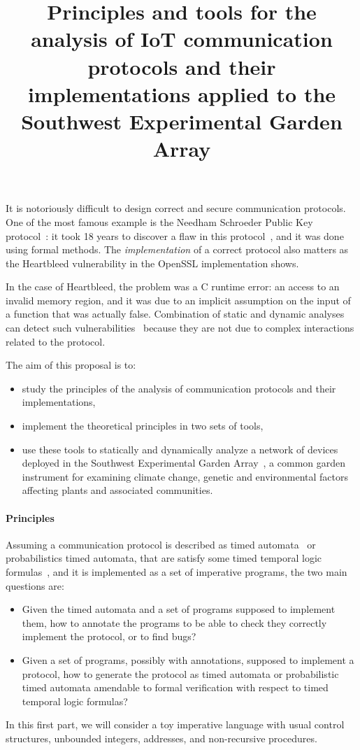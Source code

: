 \documentclass[11pt]{article}
\title{Principles and tools for the analysis of IoT communication
  protocols and their implementations applied to the\\Southwest
  Experimental Garden Array}
\begin{document}
\maketitle

It is notoriously difficult to design correct and secure communication
protocols. One of the most famous example is the Needham Schroeder
Public Key protocol~\cite{NS1978:CACM}: it took 18 years to discover a
flaw in this protocol~\cite{LOW1996:TACAS}, and it was done using
formal methods. The {\em implementation} of a correct protocol also
matters as the Heartbleed vulnerability in the OpenSSL implementation
shows.

In the case of Heartbleed, the problem was a C runtime error: an
access to an invalid memory region, and it was due to an implicit
assumption on the input of a function that was actually false.
Combination of static and dynamic analyses can detect such
vulnerabilities~\cite{KKP2015:HVC} because they are not due to complex
interactions related to the protocol.

The aim of this proposal is to:
\begin{itemize}[itemsep=0pt]
\item study the principles of the analysis of communication protocols and
  their implementations,
\item implement the theoretical principles in two sets of tools,
\item use these tools to statically and dynamically analyze a network
  of devices deployed in the Southwest Experimental Garden
  Array~\cite{SEGA}, a common garden instrument for examining climate
  change, genetic and environmental factors affecting plants and
  associated communities.
\end{itemize}

\paragraph{Principles} Assuming a communication protocol is described
as timed automata~\cite{AD1994:TCS} or probabilistics timed automata,
that are satisfy some timed temporal logic
formulas~\cite{BLM2017:LNCS}, and it is implemented as a set of
imperative programs, the two main questions are:
\begin{itemize}[itemsep=0pt]
\item Given the timed automata and a set of programs supposed to
  implement them, how to annotate the programs to be able to check
  they correctly implement the protocol, or to find bugs?
\item Given a set of programs, possibly with annotations, supposed to
  implement a protocol, how to generate the protocol as timed automata
  or probabilistic timed automata amendable to formal verification
  with respect to timed temporal logic formulas?
\end{itemize}
In this first part, we will consider a toy imperative language with
usual control structures, unbounded integers, addresses, and
non-recursive procedures.
\end{document}
